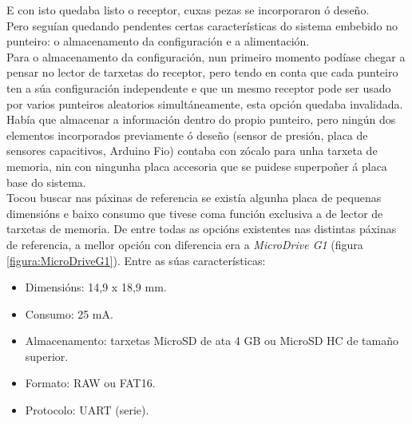   E con isto quedaba listo o receptor, cuxas pezas se incorporaron ó deseño. \\

  Pero seguían quedando pendentes certas características do sistema embebido no
  punteiro: o almacenamento da configuración e a alimentación. \\

  Para o almacenamento da configuración, nun primeiro momento podíase chegar a
  pensar no lector de tarxetas do receptor, pero tendo en conta que cada
  punteiro ten a súa configuración independente e que un mesmo receptor pode
  ser usado por varios punteiros aleatorios simultáneamente, esta opción
  quedaba invalidada. \\

  Había que almacenar a información dentro do propio punteiro, pero ningún dos
  elementos incorporados previamente ó deseño (sensor de presión, placa de
  sensores capacitivos, Arduino Fio) contaba con zócalo para unha tarxeta de
  memoria, nin con ningunha placa accesoria que se puidese superpoñer á placa
  base do sistema. \\

  Tocou buscar nas páxinas de referencia se existía algunha placa de pequenas
  dimensións e baixo consumo que tivese coma función exclusiva a de lector de
  tarxetas de memoria. De entre todas as opcións existentes nas distintas
  páxinas de referencia, a mellor opción con diferencia era a
  \textit{MicroDrive G1} \cite{MicroDriveG1} (figura
  \ref{figura:MicroDriveG1}). Entre as súas características:

  \begin{itemize}
   \item Dimensións: 14,9 x 18,9 mm.
   \item Consumo: 25 mA.
   \item Almacenamento: tarxetas MicroSD de ata 4 GB ou MicroSD HC de tamaño
         superior.
   \item Formato: RAW ou FAT16.
   \item Protocolo: UART (serie).
  \end{itemize}

